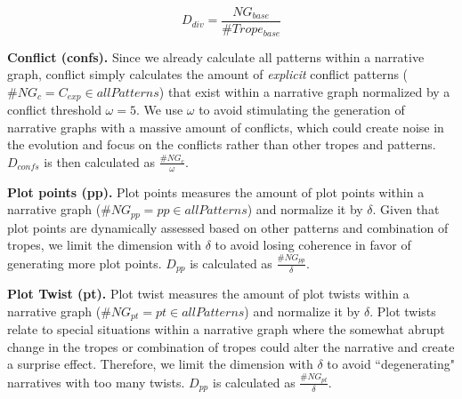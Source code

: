 
\begin{equation}
\label{eq:diversityDim}
D_{div} =  \frac{NG_{base}}{\#Trope_{base}}
\end{equation}


\textbf{Conflict (confs).} Since we already calculate all patterns within a narrative graph, conflict simply calculates the amount of \emph{explicit} conflict patterns ($\#NG_{c} = C_{exp} \in allPatterns$) that exist within a narrative graph normalized by a conflict threshold $\omega = 5$. We use $\omega$ to avoid stimulating the generation of narrative graphs with a massive amount of conflicts, which could create noise in the evolution and focus on the conflicts rather than other tropes and patterns. $D_{confs}$ is then calculated as $\frac{\#NG_{c}}{\omega}$.



\textbf{Plot points (pp).} Plot points measures the amount of plot points within a narrative graph ($\#NG_{pp} = pp \in allPatterns$) and normalize it by $\delta$. Given that plot points are dynamically assessed based on other patterns and combination of tropes, we limit the dimension with $\delta$ to avoid losing coherence in favor of generating more plot points. $D_{pp}$ is calculated as $\frac{\#NG_{pp}}{\delta}$.

\textbf{Plot Twist (pt).} Plot twist measures the amount of plot twists within a narrative graph ($\#NG_{pt} = pt \in allPatterns$) and normalize it by $\delta$. Plot twists relate to special situations within a narrative graph where the somewhat abrupt change in the tropes or combination of tropes could alter the narrative and create a surprise effect. Therefore, we limit the dimension with $\delta$ to avoid ``degenerating" narratives with too many twists. $D_{pp}$ is calculated as $\frac{\#NG_{pt}}{\delta}$.

